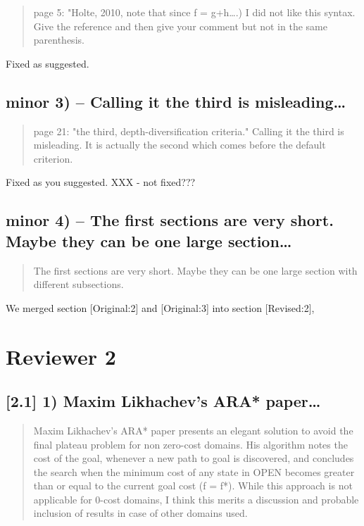 \documentclass{article}
\begin{document}
\begin{quote}
page 5: "Holte, 2010, note that since f = g+h\ldots{}.) I did not like this
syntax. Give the reference and then give your comment but not in the
same parenthesis.
\end{quote}

Fixed as suggested.

\subsection{minor 3) -- Calling it the  third is misleading\ldots{}}
\label{sec:orgheadline11}

\begin{quote}
page 21: "the third, depth-diversification criteria." Calling it the
third is misleading. It is actually the second which comes before the
default criterion.
\end{quote}

Fixed as you suggested.  XXX - not fixed???

\subsection{minor 4) -- The first sections are very short. Maybe they can be one large section\ldots{}}
\label{sec:orgheadline12}

\begin{quote}
The first sections are very short. Maybe they can be one large section
with different subsections.
\end{quote}

We merged section [Original:2] and [Original:3] into section [Revised:2],

\section{Reviewer 2}
\label{sec:orgheadline25}

\subsection{[2.1] 1) Maxim Likhachev's ARA* paper\ldots{}}
\label{sec:orgheadline14}

\begin{quote}
 Maxim Likhachev's ARA* paper presents an elegant solution to
avoid the final plateau problem for non zero-cost domains. His
algorithm notes the cost of the goal, whenever a new path to goal is
discovered, and concludes the search when the minimum cost of any
state in OPEN becomes greater than or equal to the current goal cost
(f = f*). While this approach is not applicable for 0-cost domains, I
think this merits a discussion and probable inclusion of results in
case of other domains used.
\end{quote}
\end{document}
